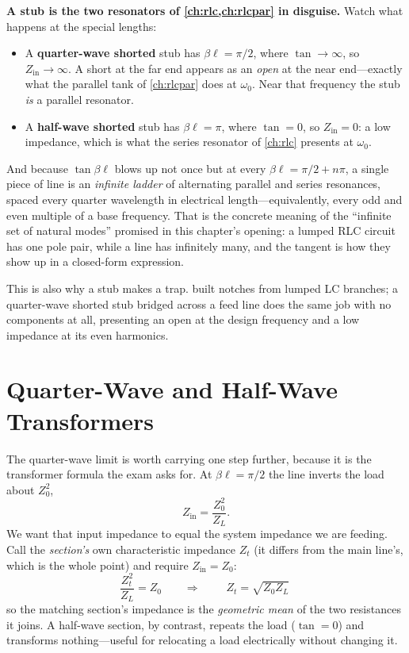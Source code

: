 \begin{physicalbox}
\textbf{A stub is the two resonators of \cref{ch:rlc,ch:rlcpar} in disguise.}
Watch what happens at the special lengths:
\begin{itemize}
\item A \textbf{quarter-wave shorted} stub has \(\beta\ell=\pi/2\), where
\(\tan\to\infty\), so \(Z_{\mathrm{in}}\to\infty\). A short at the far end appears
as an \emph{open} at the near end---exactly what the parallel tank of
\cref{ch:rlcpar} does at \(\omega_0\). Near that frequency the stub \emph{is} a
parallel resonator.
\item A \textbf{half-wave shorted} stub has \(\beta\ell=\pi\), where \(\tan=0\), so
\(Z_{\mathrm{in}}=0\): a low impedance, which is what the series resonator of
\cref{ch:rlc} presents at \(\omega_0\).
\end{itemize}
And because \(\tan\beta\ell\) blows up not once but at every
\(\beta\ell=\pi/2+n\pi\), a single piece of line is an \emph{infinite ladder} of
alternating parallel and series resonances, spaced every quarter wavelength in
electrical length---equivalently, every odd and even multiple of a base frequency.
That is the concrete meaning of the ``infinite set of natural modes'' promised in
this chapter's opening: a lumped RLC circuit has one pole pair, while a line has
infinitely many, and the tangent is how they show up in a closed-form expression.

This is also why a stub makes a trap.  built notches from lumped
LC branches; a quarter-wave shorted stub bridged across a feed line does the same
job with no components at all, presenting an open at the design frequency and a low
impedance at its even harmonics.
\end{physicalbox}

\section{Quarter-Wave and Half-Wave Transformers}
The quarter-wave limit is worth carrying one step further, because it is the
transformer formula the exam asks for. At \(\beta\ell=\pi/2\) the line inverts the
load about \(Z_0^2\),
\[
Z_{\mathrm{in}}=\frac{Z_0^2}{Z_L}.
\]
We want that input impedance to equal the system impedance we are feeding. Call the
\emph{section's} own characteristic impedance \(Z_t\) (it differs from the main
line's, which is the whole point) and require \(Z_{\mathrm{in}}=Z_0\):
\[
\frac{Z_t^2}{Z_L}=Z_0
\qquad\Longrightarrow\qquad
\boxed{\;Z_t=\sqrt{Z_0Z_L}\;}
\]
so the matching section's impedance is the \emph{geometric mean} of the two
resistances it joins. A half-wave section, by contrast, repeats the load
(\(\tan=0\)) and transforms nothing---useful for relocating a load electrically
without changing it.

